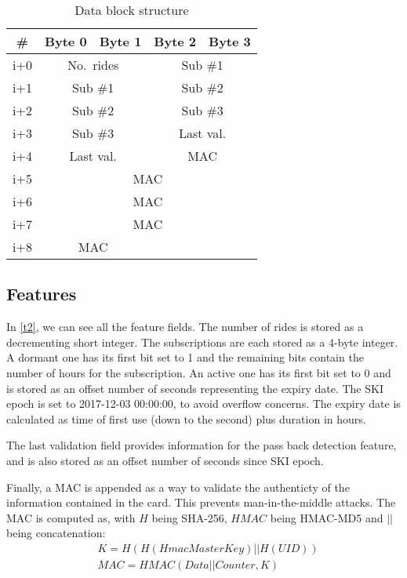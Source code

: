 \documentclass[paper=a4, fontsize=11pt]{scrartcl}
\begin{document}
\begin{table}[h!]
    \centering
    \begin{tabular}{|c|c|c|c|c|}
        \hline
        \# & Byte 0 & Byte 1 & Byte 2 & Byte 3 \\
        \hline
        i+0 & \multicolumn{2}{|c|}{No.\ rides} & \multicolumn{2}{|c|}{Sub \#1} \\
        \hline
        i+1 & \multicolumn{2}{|c|}{Sub \#1} & \multicolumn{2}{|c|}{Sub \#2} \\
        \hline
        i+2 & \multicolumn{2}{|c|}{Sub \#2} & \multicolumn{2}{|c|}{Sub \#3} \\
        \hline
        i+3 & \multicolumn{2}{|c|}{Sub \#3} & \multicolumn{2}{|c|}{Last val.} \\
        \hline
        i+4 & \multicolumn{2}{|c|}{Last val.} & \multicolumn{2}{|c|}{MAC} \\
        \hline
        i+5 & \multicolumn{4}{|c|}{MAC} \\
        \hline
        i+6 & \multicolumn{4}{|c|}{MAC} \\
        \hline
        i+7 & \multicolumn{4}{|c|}{MAC} \\
        \hline
        i+8 & \multicolumn{2}{|c|}{MAC} & & \\
        \hline
    \end{tabular}
    \caption{Data block structure}
    \label{t2}
\end{table}

\subsection{Features}

In \autoref{t2}, we can see all the feature fields.
The number of rides is stored as a decrementing short integer.
The subscriptions are each stored as a 4-byte integer.
A dormant one has its first bit set to 1 and the remaining bits contain the
number of hours for the subscription.
An active one has its first bit set to 0 and is stored as an offset number of
seconds representing the expiry date. The SKI epoch is set to 2017-12-03
00:00:00, to avoid overflow concerns.
The expiry date is calculated as time of first use (down to the second) plus duration in hours.

The last validation field provides information for the pass back detection
feature, and is also stored as an offset number of seconds since SKI epoch.

Finally, a MAC is appended as a way to validate the authenticty of the
information contained in the card.
This prevents man-in-the-middle attacks.
The MAC is computed as, with $H$ being SHA-256, $HMAC$ being HMAC-MD5 and $||$
being concatenation:
\begin{align*}
    & K = H(H(HmacMasterKey) || H(UID)) \\
    & MAC = HMAC(Data || Counter, K)
\end{align*}
\end{document}
